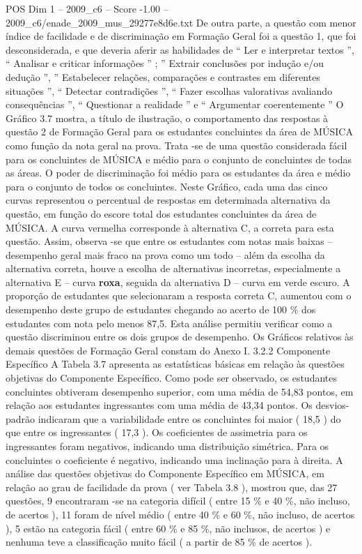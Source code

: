 \begin{textsample}{POS Dim 1 – 2009\_c6 – Score -1.00 – 2009\_c6/enade\_2009\_mus\_29277e8d6e.txt}
De outra parte, a questão com menor índice de facilidade e de discriminação em Formação Geral foi a questão 1, que foi desconsiderada, e que deveria aferir as habilidades de “ Ler e interpretar textos ”, “ Analisar e criticar informações ” ; ” Extrair conclusões por indução e/ou dedução ”, ” Estabelecer relações, comparações e contrastes em diferentes situações ”, “ Detectar contradições ”, “ Fazer escolhas valorativas avaliando consequências ”, “ Questionar a realidade ” e “ Argumentar coerentemente ” O Gráfico 3.7 mostra, a título de ilustração, o comportamento das respostas à questão 2 de Formação Geral para os estudantes concluintes da área de MÚSICA como função da nota geral na prova.
Trata -se de uma questão considerada fácil para os concluintes de MÚSICA e médio para o conjunto de concluintes de todas as áreas.
O poder de discriminação foi médio para os estudantes da área e médio para o conjunto de todos os concluintes.
Neste Gráfico, cada uma das cinco curvas representou o percentual de respostas em determinada alternativa da questão, em função do escore total dos estudantes concluintes da área de MÚSICA.
A curva vermelha corresponde à alternativa C, a correta para esta questão.
Assim, observa -se que entre os estudantes com notas mais baixas – desempenho geral mais fraco na prova como um todo – além da escolha da alternativa correta, houve a escolha de alternativas incorretas, especialmente a alternativa E – curva \textbf{roxa}, seguida da alternativa D – curva em verde escuro.
A proporção de estudantes que selecionaram a resposta correta C, aumentou com o desempenho deste grupo de estudantes chegando ao acerto de 100 \% dos estudantes com nota pelo menos 87,5.
Esta análise permitiu verificar como a questão discriminou entre os dois grupos de desempenho.
Os Gráficos relativos às demais questões de Formação Geral constam do Anexo I. 3.2.2 Componente Específico A Tabela 3.7 apresenta as estatísticas básicas em relação às questões objetivas do Componente Específico.
Como pode ser observado, os estudantes concluintes obtiveram desempenho superior, com uma média de 54,83 pontos, em relação aos estudantes ingressantes com uma média de 43,34 pontos.
Os desvios-padrão indicaram que a variabilidade entre os concluintes foi maior ( 18,5 ) do que entre os ingressantes ( 17,3 ).
Os coeficientes de assimetria para os ingressantes foram negativos, indicando uma distribuição simétrica.
Para os concluintes o coeficiente é negativo, indicando uma inclinação para à direita.
A análise das questões objetivas do Componente Específico em MÚSICA, em relação ao grau de facilidade da prova ( ver Tabela 3.8 ), mostrou que, das 27 questões, 9 encontraram -se na categoria difícil ( entre 15 \% e 40 \%, não incluso, de acertos ), 11 foram de nível médio ( entre 40 \% e 60 \%, não incluso, de acertos ), 5 estão na categoria fácil ( entre 60 \% e 85 \%, não inclusos, de acertos ) e nenhuma teve a classificação muito fácil ( a partir de 85 \% de acertos ).

\end{textsample}
